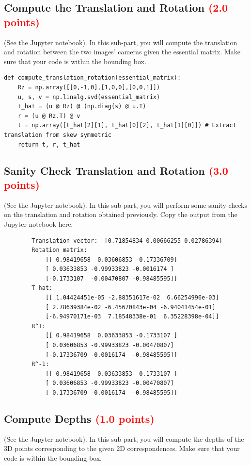 \documentclass[answers]{exam}
\newcommand{\mypoints}[1]{\textcolor{red}{(#1 points)}}
\begin{document}
\subsection{Compute the Translation and Rotation \mypoints{2.0}}
(See the Jupyter notebook). In this sub-part, you will compute the translation and rotation between the two images' cameras given the essential matrix. Make sure that your code is within the bounding box.
\begin{solution}
    \begin{verbatim}
def compute_translation_rotation(essential_matrix):
    Rz = np.array([[0,-1,0],[1,0,0],[0,0,1]])
    u, s, v = np.linalg.svd(essential_matrix)
    t_hat = (u @ Rz) @ (np.diag(s) @ u.T)
    r = (u @ Rz.T) @ v
    t = np.array([t_hat[2][1], t_hat[0][2], t_hat[1][0]]) # Extract translation from skew symmetric
    return t, r, t_hat
    \end{verbatim}
\end{solution}
 
\subsection{Sanity Check Translation and Rotation \mypoints{3.0}}
(See the Jupyter notebook). In this sub-part, you will perform some sanity-checks on the translation and rotation obtained previously. Copy the output from the Jupyter notebook here.
\begin{solution}
    \begin{verbatim}
        Translation vector:  [0.71854834 0.00666255 0.02786394]
        Rotation matrix: 
            [[ 0.98419658  0.03606853 -0.17336709]
            [ 0.03633853 -0.99933823 -0.0016174 ]
            [-0.1733107  -0.00470807 -0.98485595]]
        T_hat: 
            [[ 1.04424451e-05 -2.88351617e-02  6.66254996e-03]
            [ 2.78639384e-02 -6.45670843e-04 -6.94041454e-01]
            [-6.94970171e-03  7.18548338e-01  6.35228398e-04]]
        R^T: 
            [[ 0.98419658  0.03633853 -0.1733107 ]
            [ 0.03606853 -0.99933823 -0.00470807]
            [-0.17336709 -0.0016174  -0.98485595]]
        R^-1: 
            [[ 0.98419658  0.03633853 -0.1733107 ]
            [ 0.03606853 -0.99933823 -0.00470807]
            [-0.17336709 -0.0016174  -0.98485595]]
    \end{verbatim}
\end{solution}

\subsection{Compute Depths \mypoints{1.0}}
(See the Jupyter notebook). In this sub-part, you will compute the depths of the 3D points corresponding to the given 2D correspondences. Make sure that your code is within the bounding box.
\end{document}
